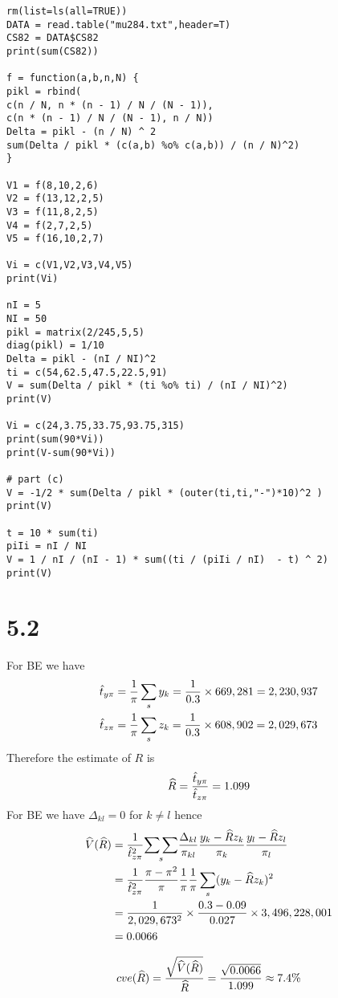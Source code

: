 \documentclass[12pt]{article}
\begin{document}
\begin{verbatim}
rm(list=ls(all=TRUE))
DATA = read.table("mu284.txt",header=T)
CS82 = DATA$CS82
print(sum(CS82))

f = function(a,b,n,N) {
pikl = rbind(
c(n / N, n * (n - 1) / N / (N - 1)),
c(n * (n - 1) / N / (N - 1), n / N))
Delta = pikl - (n / N) ^ 2
sum(Delta / pikl * (c(a,b) %o% c(a,b)) / (n / N)^2)
}

V1 = f(8,10,2,6)
V2 = f(13,12,2,5)
V3 = f(11,8,2,5)
V4 = f(2,7,2,5)
V5 = f(16,10,2,7)

Vi = c(V1,V2,V3,V4,V5)
print(Vi)

nI = 5
NI = 50
pikl = matrix(2/245,5,5)
diag(pikl) = 1/10
Delta = pikl - (nI / NI)^2
ti = c(54,62.5,47.5,22.5,91)
V = sum(Delta / pikl * (ti %o% ti) / (nI / NI)^2)
print(V)

Vi = c(24,3.75,33.75,93.75,315)
print(sum(90*Vi))
print(V-sum(90*Vi))

# part (c)
V = -1/2 * sum(Delta / pikl * (outer(ti,ti,"-")*10)^2 )
print(V)

t = 10 * sum(ti)
piIi = nI / NI
V = 1 / nI / (nI - 1) * sum((ti / (piIi / nI)  - t) ^ 2)
print(V)
\end{verbatim}


\section*{5.2}
For BE we have
\begin{align*}
\hat t_{y\pi}&={1\over\pi}\sum_sy_k={1\over0.3}\times669,281=2,230,937\\
\hat t_{z\pi}&={1\over\pi}\sum_sz_k={1\over0.3}\times608,902=2,029,673
\end{align*}
Therefore the estimate of $R$ is
\[
\widehat R={\hat t_{y\pi}\over\hat t_{z\pi}}=1.099
\]
For BE we have $\Delta_{kl}=0$ for $k\ne l$ hence
\begin{align*}
\widehat V(\widehat R)
&=
{1\over\hat t_{z\pi}^2}
\underset{s}{\sum\sum}
{\Delta_{kl}\over\pi_{kl}}
{y_k-\widehat Rz_k\over\pi_k}
{y_l-\widehat Rz_l\over\pi_l}\\
&=
{1\over\hat t_{z\pi}^2}
{\pi-\pi^2\over\pi}
{1\over\pi}
{1\over\pi}
\sum_s(y_k-\widehat Rz_k)^2\\
&=
{1\over2,029,673^2}\times{0.3-0.09\over0.027}\times3,496,228,001\\
&=
0.0066
\end{align*}

\[
cve(\widehat R)={\sqrt{\widehat V(\widehat R)}\over\widehat R}
={\sqrt{0.0066}\over1.099}\approx7.4\%
\]
\end{document}
